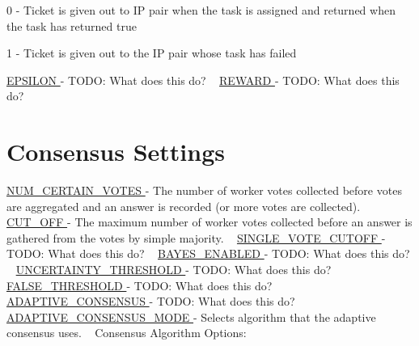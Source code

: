 \begin{DoxyItemize}
\item 0 -\/ Ticket is given out to IP pair when the task is assigned and returned when the task has returned true
\item 1 -\/ Ticket is given out to the IP pair whose task has failed
\end{DoxyItemize}

\hyperlink{namespacedynamicfilterapp_1_1toggles_a5f5369d7244632ac071379fbb460c8fe}{E\+P\+S\+I\+L\+ON } -\/ T\+O\+DO\+: What does this do? ~\newline
 \hyperlink{namespacedynamicfilterapp_1_1toggles_a058a8495c920cb75e731931532524c19}{R\+E\+W\+A\+RD } -\/ T\+O\+DO\+: What does this do? ~\newline
 \hypertarget{toggles_voteGetting}{}\section{Consensus Settings}\label{toggles_voteGetting}
\hyperlink{namespacedynamicfilterapp_1_1toggles_a157bc167f366f75c9ba8d3e36e8d8540}{N\+U\+M\+\_\+\+C\+E\+R\+T\+A\+I\+N\+\_\+\+V\+O\+T\+ES } -\/ The number of worker votes collected before votes are aggregated and an answer is recorded (or more votes are collected). ~\newline
 \hyperlink{namespacedynamicfilterapp_1_1toggles_a914791c176a78c026dc76a18bcd88d73}{C\+U\+T\+\_\+\+O\+FF } -\/ The maximum number of worker votes collected before an answer is gathered from the votes by simple majority. ~\newline
 \hyperlink{namespacedynamicfilterapp_1_1toggles_afa8e106b735033b706b1412e12f6783b}{S\+I\+N\+G\+L\+E\+\_\+\+V\+O\+T\+E\+\_\+\+C\+U\+T\+O\+FF } -\/ T\+O\+DO\+: What does this do? ~\newline
 \hyperlink{namespacedynamicfilterapp_1_1toggles_adadcb301c2f0066591eaf0a4c08ac96d}{B\+A\+Y\+E\+S\+\_\+\+E\+N\+A\+B\+L\+ED } -\/ T\+O\+DO\+: What does this do? ~\newline
 \hyperlink{namespacedynamicfilterapp_1_1toggles_aaefdc27b85545eb4a910f5c65f7d8bbb}{U\+N\+C\+E\+R\+T\+A\+I\+N\+T\+Y\+\_\+\+T\+H\+R\+E\+S\+H\+O\+LD } -\/ T\+O\+DO\+: What does this do? ~\newline
 \hyperlink{namespacedynamicfilterapp_1_1toggles_a31317fa26792fa204392549329cc31cb}{F\+A\+L\+S\+E\+\_\+\+T\+H\+R\+E\+S\+H\+O\+LD } -\/ T\+O\+DO\+: What does this do? ~\newline
 \hyperlink{namespacedynamicfilterapp_1_1toggles_a7b6800fe9bb5df8c84060ed96d9711ac}{A\+D\+A\+P\+T\+I\+V\+E\+\_\+\+C\+O\+N\+S\+E\+N\+S\+US } -\/ T\+O\+DO\+: What does this do? ~\newline
 \hyperlink{namespacedynamicfilterapp_1_1toggles_a394fa3f8531c2ecc987f982367a4af2d}{A\+D\+A\+P\+T\+I\+V\+E\+\_\+\+C\+O\+N\+S\+E\+N\+S\+U\+S\+\_\+\+M\+O\+DE } -\/ Selects algorithm that the adaptive consensus uses. ~\newline
 Consensus Algorithm Options\+: ~\newline

